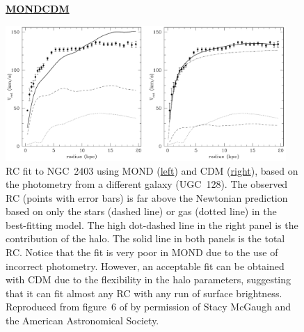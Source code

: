 \documentclass[fleqn,usenatbib,useAMS]{mnras} %
\begin{document}
\begin{figure}
	\centering
	\qquad\textbf{\underline{MOND}}\qquad\qquad\qquad\qquad\qquad\qquad\qquad\qquad\qquad\qquad\qquad\qquad\qquad\textbf{\underline{CDM}}\par\medskip
	\includegraphics[width=0.95\textwidth]{de_Blok_1998_Figure_6}
	\caption{RC fit to NGC~2403 using MOND (\underline{left}) and CDM (\underline{right}), based on the photometry from a different galaxy (UGC~128). The observed RC (points with error bars) is far above the Newtonian prediction based on only the stars (dashed line) or gas (dotted line) in the best-fitting model. The high dot-dashed line in the right panel is the contribution of the halo. The solid line in both panels is the total RC. Notice that the fit is very poor in MOND due to the use of incorrect photometry. However, an acceptable fit can be obtained with CDM due to the flexibility in the halo parameters, suggesting that it can fit almost any RC with any run of surface brightness. Reproduced from figure~6 of \citet{Blok_1998} by permission of Stacy McGaugh and the American Astronomical Society.}
	\label{de_Blok_1998_Figure_6}
\end{figure}
\end{document}
